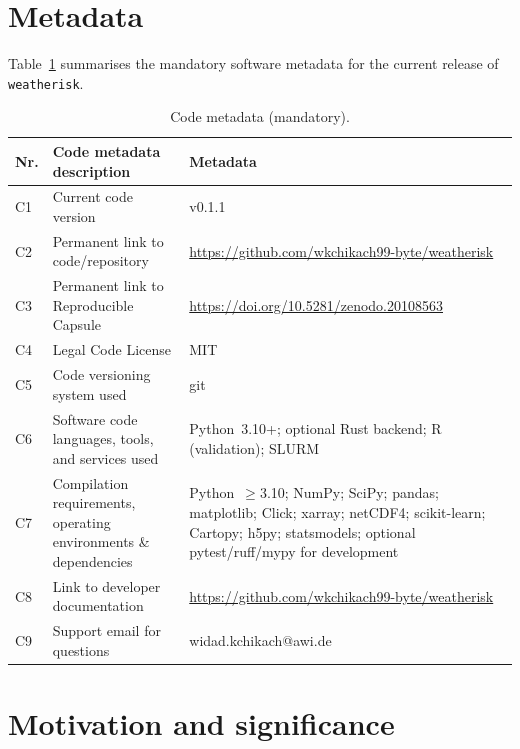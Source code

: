\documentclass[preprint,12pt,a4paper]{elsarticle}
\newcommand{\revn}[1]{{\color{RevisionViolet}#1}}
\begin{document}
\section*{Metadata}
\label{sec:metadata}

Table~\ref{tab:metadata} summarises the mandatory software metadata
for the current release of \texttt{weatherisk}.

\begin{table}[!h]
\small
\begin{tabularx}{\textwidth}{|l|>{\raggedright\arraybackslash}p{4.9cm}|>{\raggedright\arraybackslash}X|}
\hline
\textbf{Nr.} & \textbf{Code metadata description} & \textbf{Metadata} \\
\hline
C1 & Current code version & \revn{v0.1.1} \\
\hline
C2 & Permanent link to code/repository &
  \url{https://github.com/wkchikach99-byte/weatherisk} \\
\hline
C3 & Permanent link to Reproducible Capsule &
  \revn{\url{https://doi.org/10.5281/zenodo.20108563}} \\
\hline
C4 & Legal Code License & MIT \\
\hline
C5 & Code versioning system used & git \\
\hline
C6 & Software code languages, tools, and services used &
  Python~3.10+; optional Rust backend; R (validation); SLURM \\
\hline
C7 & Compilation requirements, operating environments
  \& dependencies &
  Python~$\geq$3.10; NumPy; SciPy; pandas; matplotlib;
  Click; xarray; netCDF4; scikit-learn; Cartopy; h5py;
  statsmodels; optional pytest/ruff/mypy for development \\
\hline
C8 & Link to developer documentation &
  \url{https://github.com/wkchikach99-byte/weatherisk} \\
\hline
C9 & Support email for questions & widad.kchikach@awi.de \\
\hline
\end{tabularx}
\caption{Code metadata (mandatory).}
\label{tab:metadata}
\end{table}


\section{Motivation and significance}
\label{sec:motivation}
\end{document}
